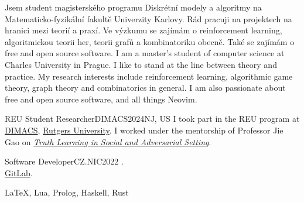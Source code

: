 \begin{intro}
	\lng
	{
		Jsem student magisterského programu Diskrétní modely a algoritmy na Matematicko-fyzikální fakultě Univerzity Karlovy.
		Rád pracuji na projektech na hranici mezi teorií a praxí.
		Ve výzkumu se zajímám o reinforcement learning, algoritmickou teorii her, teorii grafů a kombinatoriku obecně.
		Také se zajímám o free and open source software.
	}{
		I am a master's student of computer science at Charles University in Prague.
		I like to stand at the line between theory and practice.
		My research interests include reinforcement learning, algorithmic game theory, graph theory and combinatorics in general.
		I am also passionate about free and open source software, and all things Neovim.
	}
\end{intro}


\begin{multicols}{2}

\begin{work}{REU Student Researcher}{DIMACS}{2024}{NJ, US}
	{I took part in the REU program at} \href{http://dmac.rutgers.edu/}{DIMACS}, \href{https://www.rutgers.edu/}{Rutgers University}.
	{I worked under the mentorship of Professor Jie Gao on} \emph{\href{https://reu.dimacs.rutgers.edu/~fu37/}{Truth Learning in Social and Adversarial Setting}}.
\end{work}

\worksplit

\begin{work}{Software Developer}{CZ.NIC}{2022}{\Praha{}}
	.\\
	 \href{https://gitlab.nic.cz/fred/eppic}{GitLab}.
\end{work}






\LaTeX, Lua, Prolog, Haskell, Rust


\end{multicols}
